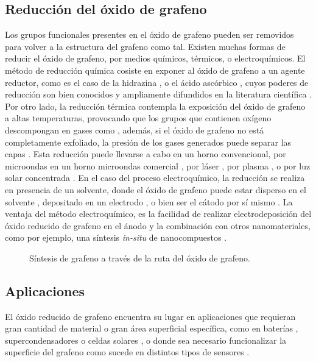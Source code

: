 \subsection{Reducción del óxido de grafeno}
Los grupos funcionales presentes en el óxido de grafeno pueden ser removidos para volver a la estructura del grafeno como tal.
Existen muchas formas de reducir el óxido de grafeno, por medios químicos, térmicos, o electroquímicos. El método de reducción química cosiste en exponer al óxido de grafeno a un agente reductor, como es el caso de la hidrazina , o el ácido ascórbico \citep{Fernandez-Merino2010}, cuyos poderes de reducción son bien conocidos y ampliamente difundidos en la literatura científica \citep{Chua2015}. Por otro lado, la reducción térmica contempla la exposición del óxido de grafeno a altas temperaturas, provocando que los grupos que contienen oxígeno descompongan en gases como , además, si el óxido de grafeno no está completamente exfoliado, la presión de los gases generados puede separar las capas \citep{Pei2012}. Esta reducción puede llevarse a cabo en un horno convencional, por microondas en un horno microondas comercial \citep{Zhu2010a}, por láser \citep{El-Kady2013}, por plasma \citep{Lee2012}, o por luz solar concentrada \citep{Mohandoss2017}. En el caso del proceso electroquímico, la reducción se realiza en presencia de un solvente, donde el óxido de grafeno puede estar disperso en el solvente \citep{Liu2011}, depositado en un electrodo \citep{Harima2011, Toh2014}, o bien ser el cátodo por sí mismo \citep{Feng2016}. La ventaja del método electroquímico, es la facilidad de realizar electrodeposición del óxido reducido de grafeno en el ánodo y la combinación con otros nanomateriales, como por ejemplo, una síntesis \emph{in-situ} de nanocompuestos \citep{Liu2011, Xie2014}.


\begin{figure}
	\centering
	\caption{Síntesis de grafeno a través de la ruta del óxido de grafeno.}
	\label{fig:graphiteToRGO}
\end{figure}

\subsection{Aplicaciones}
El óxido reducido de grafeno encuentra su lugar en aplicaciones que requieran gran cantidad de material o gran área superficial específica, como en baterías \citep{Li2014}, supercondensadores \citep{Stoller2008} o celdas solares \citep{Roy-mayhew2014}, o donde sea necesario funcionalizar la superficie del grafeno como sucede en distintos tipos de sensores \citep{Schedin2007, Haick2013}.

